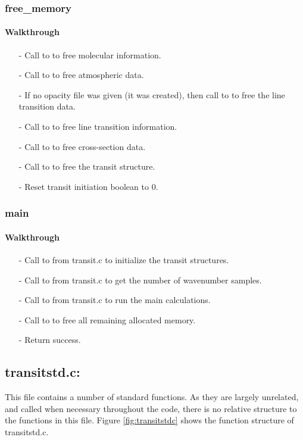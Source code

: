 \documentclass[letterpaper,12pt]{article}
\begin{document}
\subsubsection{free\_memory}
\paragraph{Walkthrough}
\begin{enumerate}[leftmargin=10pt, noitemsep, parsep=0pt, topsep=0ex]
\item[-] Call to  to free molecular information.
\item[-] Call to  to free atmospheric data.
\item[-] If no opacity file was given (it was created), then call to  to free the line transition data.
\item[-] Call to  to free line transition information.
\item[-] Call to  to free cross-section data.
\item[-] Call to  to free the transit structure.
\item[-] Reset transit initiation boolean to 0.
\end{enumerate}

\subsubsection{main}
\paragraph{Walkthrough}
\begin{enumerate}[leftmargin=10pt, noitemsep, parsep=0pt, topsep=0ex]
\item[-] Call to  from transit.c to initialize the transit structures.
\item[-] Call to  from transit.c to get the number of wavenumber samples.
\item[-] Call to  from transit.c to run the main calculations.
\item[-] Call to  to free all remaining allocated memory.
\item[-] Return success.
\end{enumerate}

\subsection{transitstd.c:}
This file contains a number of standard functions. As they are largely unrelated, and called when necessary throughout the code, there is no relative structure to the functions in this file. Figure \ref{fig:transitstdc} shows the function structure of transitstd.c.
\end{document}
